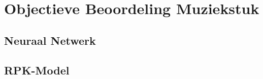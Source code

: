 \chapter{Objectieve Beoordeling Muziekstuk}
\label{hoofdstuk:OBM}

\section{Neuraal Netwerk}
\label{OBM:NN}

\section{RPK-Model}
\label{OBM:RPK}

